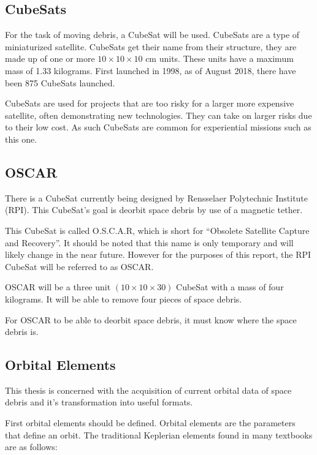 \documentclass[12pt]{report}
\begin{document}
	\subsection{CubeSats}
	For the task of moving debris, a CubeSat will be used. CubeSats are a type of miniaturized satellite. CubeSats get their name from their structure, they are made up of one or more $10\times10\times10$ cm units.	These units have a maximum mass of 1.33 kilograms. First launched in 1998, as of August 2018, there have been 875 CubeSats launched\cite{nanosats_eu}. \par 
	
	
	
	CubeSats are used for projects that are too risky for a larger more expensive satellite, often demonstrating new technologies. They can take on larger risks due to their low cost. As such CubeSats are common for experiential missions such as this one.
	
	\subsection{OSCAR}
	There is a CubeSat currently being designed by Rensselaer Polytechnic Institute (RPI). This CubeSat's goal is deorbit space debris by use of a magnetic tether. \par 
	
	
	This CubeSat is called O.S.C.A.R, which is short for “Obsolete Satellite Capture and Recovery”. It should be noted that this name is only temporary and will likely change in the near future. However for the purposes of this report, the RPI CubeSat will be referred to as OSCAR.\par 
	
	OSCAR will be a three unit  $(10\times10\times30)$ CubeSat with a mass of four kilograms. It will be able to remove four pieces of space debris.\cite{paulT}
	
	For OSCAR to be able to deorbit space debris, it must know where the space debris is. 
	
	\subsection{Orbital Elements}
	
	This thesis is concerned with the acquisition of current orbital data of space debris and it's transformation into useful formats. 
	
	First orbital elements should be defined. Orbital elements are the parameters that define an orbit. The traditional Keplerian elements found in many textbooks are as follows: 
	
\end{document}
